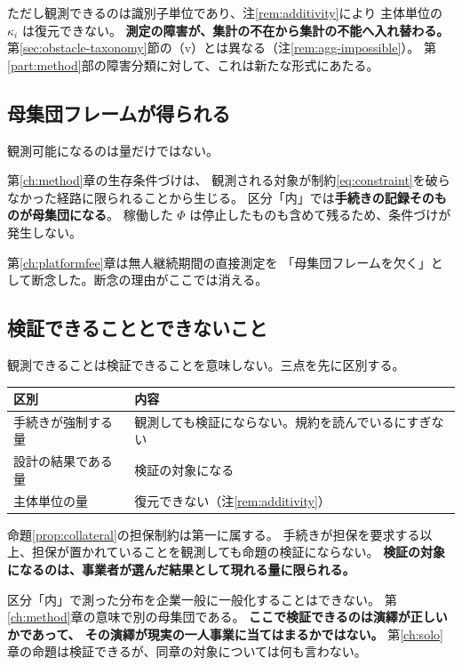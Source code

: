 ただし観測できるのは識別子単位であり、注\ref{rem:additivity}により
主体単位の $\kappa_i$ は復元できない。
\textbf{測定の障害が、集計の不在から集計の不能へ入れ替わる。}
第\ref{sec:obstacle-taxonomy}節の（v）とは異なる（注\ref{rem:agg-impossible}）。
第\ref{part:method}部の障害分類に対して、これは新たな形式にあたる。

\subsection{母集団フレームが得られる}
\label{sec:protocol-frame}

観測可能になるのは量だけではない。

第\ref{ch:method}章の生存条件づけは、
観測される対象が制約\eqref{eq:constraint}を破らなかった経路に限られることから生じる。
区分「内」では\textbf{手続きの記録そのものが母集団になる}。
稼働した $\Phi$ は停止したものも含めて残るため、条件づけが発生しない。

第\ref{ch:platformfee}章は無人継続期間の直接測定を
「母集団フレームを欠く」として断念した。断念の理由がここでは消える。

\subsection{検証できることとできないこと}
\label{sec:protocol-testable}

観測できることは検証できることを意味しない。三点を先に区別する。

\begin{center}
\begin{tabularx}{\textwidth}{@{}lX@{}}
\toprule
区別 & 内容 \\
\midrule
手続きが強制する量 & 観測しても検証にならない。規約を読んでいるにすぎない \\
設計の結果である量 & 検証の対象になる \\
主体単位の量 & 復元できない（注\ref{rem:additivity}） \\
\bottomrule
\end{tabularx}
\label{tab:protocol-testability}
\end{center}

命題\ref{prop:collateral}の担保制約は第一に属する。
手続きが担保を要求する以上、担保が置かれていることを観測しても命題の検証にならない。
\textbf{検証の対象になるのは、事業者が選んだ結果として現れる量に限られる。}

\begin{remark}[母集団が異なる]
\label{rem:protocol-population}
区分「内」で測った分布を企業一般に一般化することはできない。
第\ref{ch:method}章の意味で別の母集団である。
\textbf{ここで検証できるのは演繹が正しいかであって、
その演繹が現実の一人事業に当てはまるかではない。}
第\ref{ch:solo}章の命題は検証できるが、同章の対象については何も言わない。
\end{remark}

